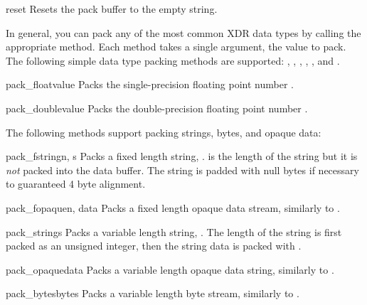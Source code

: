 \begin{methoddesc}[Packer]{reset}{}
Resets the pack buffer to the empty string.
\end{methoddesc}

In general, you can pack any of the most common XDR data types by
calling the appropriate  method.  Each method
takes a single argument, the value to pack.  The following simple data
type packing methods are supported: ,
, , ,
, and .

\begin{methoddesc}[Packer]{pack_float}{value}
Packs the single-precision floating point number .
\end{methoddesc}

\begin{methoddesc}[Packer]{pack_double}{value}
Packs the double-precision floating point number .
\end{methoddesc}

The following methods support packing strings, bytes, and opaque data:

\begin{methoddesc}[Packer]{pack_fstring}{n, s}
Packs a fixed length string, .   is the length of the
string but it is \emph{not} packed into the data buffer.  The string
is padded with null bytes if necessary to guaranteed 4 byte alignment.
\end{methoddesc}

\begin{methoddesc}[Packer]{pack_fopaque}{n, data}
Packs a fixed length opaque data stream, similarly to
.
\end{methoddesc}

\begin{methoddesc}[Packer]{pack_string}{s}
Packs a variable length string, .  The length of the string is
first packed as an unsigned integer, then the string data is packed
with .
\end{methoddesc}

\begin{methoddesc}[Packer]{pack_opaque}{data}
Packs a variable length opaque data string, similarly to
.
\end{methoddesc}

\begin{methoddesc}[Packer]{pack_bytes}{bytes}
Packs a variable length byte stream, similarly to .
\end{methoddesc}

